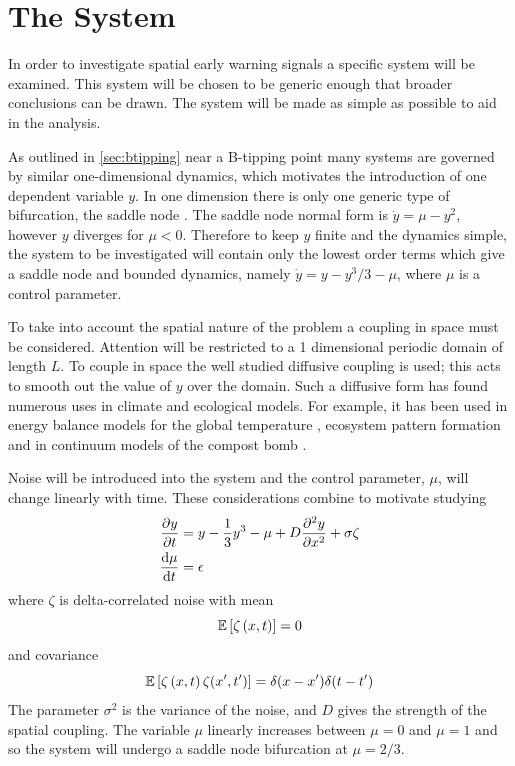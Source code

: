 \section{The System}
In order to investigate spatial early warning signals a specific system will be examined. This system will be chosen
to be generic enough that broader conclusions can be drawn. The system will be made as simple as possible to aid in the analysis.

As outlined in \cref{sec:btipping} near a B-tipping point many systems are governed by similar one-dimensional dynamics, which motivates the introduction of one dependent
variable $y$. In one dimension there is only one generic type of bifurcation, the saddle node \parencite{Thompson1994}. The saddle node normal form is
$\dot{y} = \mu - y^2$, however $y$ diverges for $\mu < 0$. Therefore to keep $y$ finite and the dynamics simple, the system to be investigated will contain only the lowest order terms
which give a saddle node and bounded dynamics, namely $\dot{y} = y - y^3/3 - \mu$, where $\mu$ is a control parameter.

To take into account the spatial nature of the problem a coupling in space must be considered. Attention will be restricted to a 1 dimensional
periodic domain of length $L$. To couple in space the well studied diffusive coupling is used; this acts to smooth out the value of $y$ over the domain.
Such a diffusive form has found numerous uses in climate and ecological models. For example, it has been used in energy balance models for
the global temperature \parencite{Ghil1976}, ecosystem pattern formation \parencite{Gowda2014,Bastiaansen2018} and in continuum models of the compost bomb \parencite{Clarke2021}.

Noise will be introduced into the system and the control parameter, $\mu$,  will change linearly with time. These considerations combine to motivate studying
\begin{subequations}
\label{eq:spatial_system}
  \begin{align}
    \pdv{y}{t} &= y - \frac{1}{3}y^3 - \mu + D\pdv[2]{y}{x} + \sigma\zeta \label{eq:spatial_system_y} \\
    \dv{\mu}{t}&= \epsilon \label{eq:spatial_system_mu}
  \end{align}
\end{subequations}
where $\zeta$ is delta-correlated noise with mean
\begin{equation}
  \label{eq:delta_mean}
  \operatorname*{\mathbb{E}} \left[\zeta\left(x,t\right)\right] = 0 
\end{equation}
and covariance
\begin{equation}
  \label{eq:delta_cov}
  \operatorname*{\mathbb{E}} \left[\zeta\left(x,t\right)\zeta(x',t')\right] = \delta(x-x')\delta(t-t') 
\end{equation}
The parameter $\sigma^2$ is the variance of the noise, and $D$ gives the strength of the spatial coupling.
The variable $\mu$ linearly increases between $\mu = 0$ and $\mu = 1$ and so the system will undergo a saddle node bifurcation at $\mu = 2/3$. 

